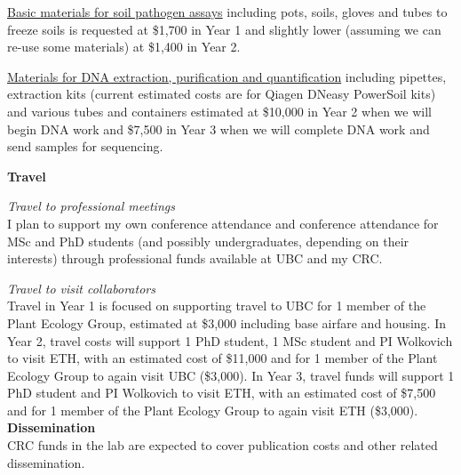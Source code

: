 \documentclass[12pt,oneside]{article}
\begin{document}
\underline{Basic materials for soil pathogen assays} including pots, soils, gloves and tubes to freeze soils is requested at \$1,700 in Year 1 and slightly lower (assuming we can re-use some materials) at \$1,400 in Year 2. 

\underline{Materials for DNA extraction, purification and quantification} including pipettes, extraction kits (current estimated costs are for Qiagen DNeasy PowerSoil kits) and various tubes and containers estimated at \$10,000 in Year 2 when we will begin DNA work and \$7,500 in Year 3 when we will complete DNA work and send samples for sequencing. 

{\bf Travel}

\emph{Travel to professional meetings}\\
I plan to support my own conference attendance and conference attendance for MSc and PhD students (and possibly undergraduates, depending on their interests) through professional funds available at UBC and my CRC. %

\emph{Travel to visit collaborators}\\
Travel in Year 1 is focused on supporting travel to UBC for 1 member of the Plant Ecology Group, estimated at \$3,000 including base airfare and housing. In Year 2, travel costs will support 1 PhD student, 1 MSc student and PI Wolkovich to visit ETH, with an estimated cost of \$11,000 and for 1 member of the Plant Ecology Group to again visit UBC (\$3,000). In Year 3,  travel funds will support 1 PhD student and PI Wolkovich to visit ETH, with an estimated cost of \$7,500 and for 1 member of the Plant Ecology Group to again visit ETH (\$3,000). \\

{\bf Dissemination}\\ 
CRC funds in the lab are expected to cover publication costs and other related dissemination. \\
\end{document}
